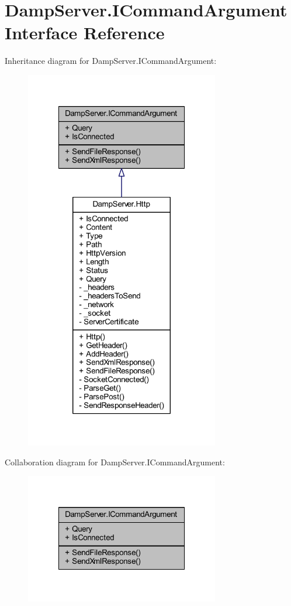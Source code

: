 \hypertarget{interface_damp_server_1_1_i_command_argument}{\section{Damp\-Server.\-I\-Command\-Argument Interface Reference}
\label{interface_damp_server_1_1_i_command_argument}
}


Inheritance diagram for Damp\-Server.\-I\-Command\-Argument\-:
\nopagebreak
\begin{figure}[H]
\begin{center}
\leavevmode
\includegraphics[width=240pt]{interface_damp_server_1_1_i_command_argument__inherit__graph}
\end{center}
\end{figure}


Collaboration diagram for Damp\-Server.\-I\-Command\-Argument\-:\nopagebreak
\begin{figure}[H]
\begin{center}
\leavevmode
\includegraphics[width=240pt]{interface_damp_server_1_1_i_command_argument__coll__graph}
\end{center}
\end{figure}
